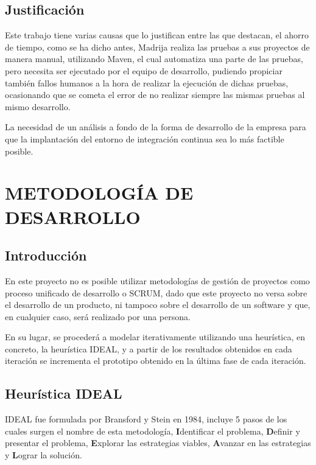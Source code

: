 \documentclass{pre-tfg}
\begin{document}
\subsection{Justificación}

Este trabajo tiene varias causas que lo justifican entre las que destacan, el ahorro de tiempo, como se ha dicho antes, Madrija realiza las pruebas a sus proyectos de manera manual, utilizando Maven, el cual automatiza una parte de las pruebas, pero necesita ser ejecutado por el equipo de desarrollo, pudiendo propiciar también fallos humanos a la hora de realizar la ejecución de dichas pruebas, ocasionando que se cometa el error de no realizar siempre las mismas pruebas al mismo desarrollo.

La necesidad de un análisis a fondo de la forma de desarrollo de la empresa para que la implantación del entorno de integración continua sea lo más factible posible.

\section{METODOLOGÍA DE DESARROLLO}
\subsection{Introducción}

En este proyecto no es posible utilizar metodologías de gestión de proyectos como proceso unificado de desarrollo o SCRUM\cite{SCRUM}, dado que este proyecto no versa sobre el desarrollo de un producto, ni tampoco sobre el desarrollo de un software y que, en cualquier caso, será realizado por una persona.

En su lugar, se procederá a modelar iterativamente utilizando una heurística, en concreto, la heurística IDEAL, y a partir de los resultados obtenidos en cada iteración se incrementa el prototipo obtenido en la última fase de cada iteración.

\subsection{Heurística IDEAL}

IDEAL fue formulada por Bransford y Stein en 1984\cite{Brans93}, incluye 5 pasos de los cuales surgen el nombre de esta metodología, \textbf{I}dentificar el problema, \textbf{D}efinir y presentar el problema, \textbf{E}xplorar las estrategias viables, \textbf{A}vanzar en las estrategias y \textbf{L}ograr la solución.
\end{document}
